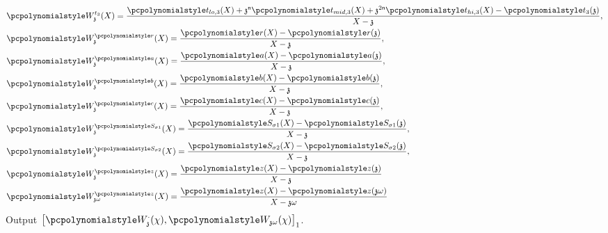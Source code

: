 \documentclass[runningheads,11pt]{llncs}
\begin{document}
\begin{description}
\begin{align*}
    & \p{W_\chz^{t_3}}(X) = \frac{\p{t_{lo, 3}}(X) + \chz^\noofc \p{t_{mid, 3}}(X) + \chz^{2 \noofc}
        \p{t_{hi, 3}}(X) - \p{t_3}(\chz)}{X - \chz}, \\
    & \p{W_\chz^{\p{r}}}(X) = \frac{\p{r}(X) - \p{r}(\chz)}{X - \chz}, \\
    & \p{W_\chz^{\p{a}}}(X) = \frac{\p{a}(X) - \p{a}(\chz)}{X - \chz}, \\
    & \p{W_\chz^{\p{b}}}(X) = \frac{\p{b}(X) - \p{b}(\chz)}{X - \chz}, \\
    & \p{W_\chz^{\p{c}}}(X) = \frac{\p{c}(X) - \p{c}(\chz)}{X - \chz}, \\
    & \p{W_\chz^{\p{S_{\sigma 1}}}}(X) = \frac{\p{S_{\sigma 1}}(X) -
      \p{S_{\sigma 1}}(\chz)}{X - \chz}, \\
    & \p{W_\chz^{\p{S_{\sigma 2}}}}(X) = \frac{\p{S_{\sigma 2}}(X) -
      \p{S_{\sigma 2}}(\chz)}{X - \chz}, \\
     & \p{W_{\chz}^{\p{z}}}(X) = \frac{\p{z}(X) - \p{z}(\chz)}{X - \chz} \\
    & \p{W_{\chz \omega}^{\p{z}}}(X) = \frac{\p{z}(X) - \p{z}(\chz \omega)}{X - \chz \omega}
 \end{align*}
	Output $\gone{\p{W_{\chz}^{\cdot}}(\chi), \p{W_{\chz \omega}}(\chi)}$.
\end{description}
\end{document}
